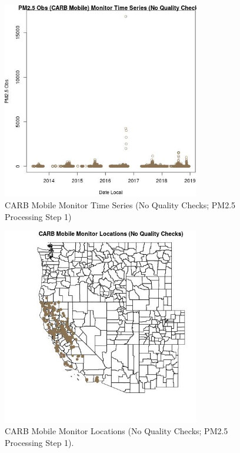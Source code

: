 
\begin{figure} 
\centering  
\includegraphics[width=0.77\textwidth]{Code_Outputs/PM25Source10TSstep1_PM25_ObsvDate_Local.jpg} 
\caption{\label{fig:PM25Source10TSstep1PM25_ObsvDate_Local}CARB Mobile Monitor Time Series (No Quality Checks; PM2.5 Processing Step 1)} 
\end{figure} 
 

\begin{figure} 
\centering  
\includegraphics[width=0.77\textwidth]{Code_Outputs/PM25Source10TSstep1_MapCARBMobileLocations.jpg} 
\caption{\label{fig:PM25Source10TSstep1MapCARBMobileLocations}CARB Mobile Monitor Locations (No Quality Checks; PM2.5 Processing Step 1).} 
\end{figure} 
 
